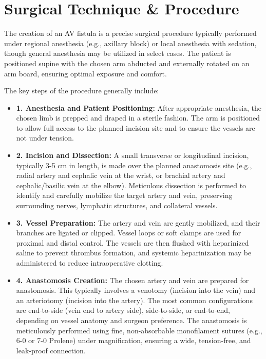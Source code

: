 \section*{Surgical Technique \& Procedure}
The creation of an AV fistula is a precise surgical procedure typically performed under regional anesthesia (e.g., axillary block) or local anesthesia with sedation, though general anesthesia may be utilized in select cases. The patient is positioned supine with the chosen arm abducted and externally rotated on an arm board, ensuring optimal exposure and comfort.

The key steps of the procedure generally include:

\begin{itemize}
  \item \textbf{1. Anesthesia and Patient Positioning:} After appropriate anesthesia, the chosen limb is prepped and draped in a sterile fashion. The arm is positioned to allow full access to the planned incision site and to ensure the vessels are not under tension.
  
  \item \textbf{2. Incision and Dissection:} A small transverse or longitudinal incision, typically 3-5 cm in length, is made over the planned anastomosis site (e.g., radial artery and cephalic vein at the wrist, or brachial artery and cephalic/basilic vein at the elbow). Meticulous dissection is performed to identify and carefully mobilize the target artery and vein, preserving surrounding nerves, lymphatic structures, and collateral vessels.

  \item \textbf{3. Vessel Preparation:} The artery and vein are gently mobilized, and their branches are ligated or clipped. Vessel loops or soft clamps are used for proximal and distal control. The vessels are then flushed with heparinized saline to prevent thrombus formation, and systemic heparinization may be administered to reduce intraoperative clotting.

  \item \textbf{4. Anastomosis Creation:} The chosen artery and vein are prepared for anastomosis. This typically involves a venotomy (incision into the vein) and an arteriotomy (incision into the artery). The most common configurations are end-to-side (vein end to artery side), side-to-side, or end-to-end, depending on vessel anatomy and surgeon preference. The anastomosis is meticulously performed using fine, non-absorbable monofilament sutures (e.g., 6-0 or 7-0 Prolene) under magnification, ensuring a wide, tension-free, and leak-proof connection.


\end{itemize}
